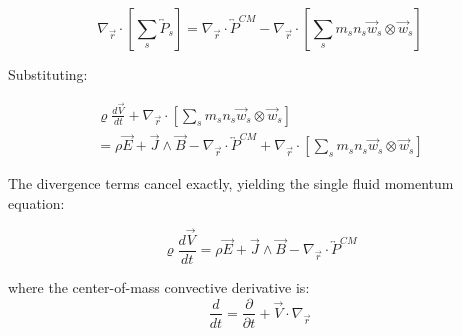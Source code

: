 \begin{equation*}
\nabla_{\vec{r}} \cdot \left[\sum_s \overleftrightarrow{P}_s\right] = \nabla_{\vec{r}} \cdot \overleftrightarrow{P}^{CM} - \nabla_{\vec{r}} \cdot \left[\sum_s m_s n_s \vec{w}_s \otimes \vec{w}_s\right]
\end{equation*}

Substituting:

\begin{multline}
\varrho \frac{d\vec{V}}{dt} + \nabla_{\vec{r}} \cdot \left[\sum_s m_s n_s \vec{w}_s \otimes \vec{w}_s\right] \\
= \rho \vec{E} + \vec{J} \wedge \vec{B} - \nabla_{\vec{r}} \cdot \overleftrightarrow{P}^{CM} + \nabla_{\vec{r}} \cdot \left[\sum_s m_s n_s \vec{w}_s \otimes \vec{w}_s\right]
\end{multline}

The divergence terms cancel exactly, yielding the single fluid momentum equation:

\begin{equation}
\varrho \frac{d\vec{V}}{dt} = \rho \vec{E} + \vec{J} \wedge \vec{B} - \nabla_{\vec{r}} \cdot \overleftrightarrow{P}^{CM}
\label{eq:single_fluid_momentum}
\end{equation}

where the center-of-mass convective derivative is:
\begin{equation*}
\frac{d}{dt} = \frac{\partial}{\partial t} + \vec{V} \cdot \nabla_{\vec{r}}
\end{equation*}